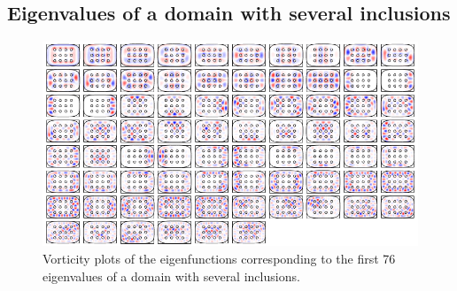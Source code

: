 %


\subsection{Eigenvalues of a domain with several inclusions}

\begin{figure}
  \centering
  \includegraphics[width=\textwidth]{many_inclusions_gallery}
  \caption{Vorticity plots of the eigenfunctions corresponding
  to the first 76 eigenvalues of a domain with several inclusions.}
  \label{fig:many_inclusions_gallery}
\end{figure}

